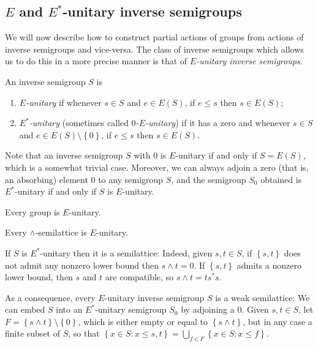 \subsection{$E$ and $E^*$-unitary inverse semigroups}

We will now describe how to construct partial actions of groups from actions of inverse semigroups and vice-versa. The class of inverse semigroups which allows us to do this in a more precise manner is that of \emph{$E$-unitary inverse semigroups}.

\begin{definition}
An inverse semigroup $S$ is
\begin{enumerate}
\item \emph{$E$-unitary} if whenever $s\in S$ and $e\in E(S)$, if $e\leq s$ then $s\in E(S)$;
\item \emph{$E^*$-unitary} (sometimes called \emph{$0$-$E$-unitary})  if it has a zero and whenever $s\in S$ and $e\in E(S)\setminus\left\{0\right\}$, if $e\leq s$ then $s\in E(S)$.
\end{enumerate}
\end{definition}

Note that an inverse semigroup $S$ with $0$ is $E$-unitary if and only if $S=E(S)$, which is a somewhat trivial case. Moreover, we can always adjoin a zero (that is, an absorbing) element $0$ to any semigroup $S$, and the semigroup $S_0$ obtained is $E^*$-unitary if and only if $S$ is $E$-unitary.

\begin{example}
Every group is $E$-unitary.
\end{example}

\begin{example}
Every $\land$-semilattice is $E$-unitary.
\end{example}

\begin{example}\label{eunitaryisweaksemilattice}
If $S$ is $E^*$-unitary then it is a semilattice: Indeed, given $s,t\in S$, if $\left\{s,t\right\}$ does not admit any nonzero lower bound then $s\land t=0$. If $\left\{s,t\right\}$ admits a nonzero lower bound, then $s$ and $t$ are compatible, so $s\land t=ts^*s$.

As a consequence, every $E$-unitary inverse semigroup $S$ is a weak semilattice: We can embed $S$ into an $E^*$-unitary semigroup $S_0$ by adjoining a $0$. Given $s,t\in S$, let $F=\left\{s\land t\right\}\setminus\left\{0\right\}$, which is either empty or equal to $\left\{s\land t\right\}$, but in any case a finite subset of $S$, so that $\left\{x\in S:x\leq s,t\right\}=\bigcup_{f\in F}\left\{x\in S:x\leq f\right\}$.
\end{example}

